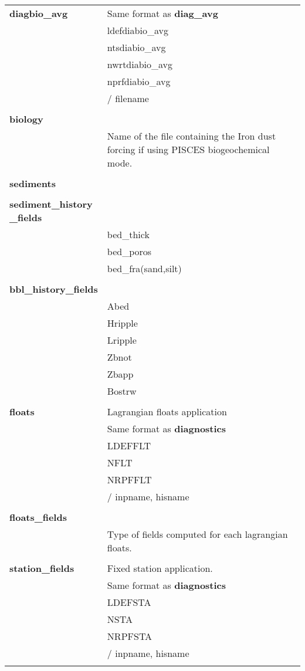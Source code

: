 \begin{longtable}{|p{0.25\linewidth}|p{0.75\linewidth}|}
\large{\textbf{diagbio\_avg}} & Same format as \large{\textbf{diag\_avg}}  \\
&ldefdiabio\_avg  \\
&ntsdiabio\_avg   \\
&nwrtdiabio\_avg  \\
&nprfdiabio\_avg  \\
&/ filename \\
&  \\ 

\large{\textbf{biology}} &     \\
& Name of the file containing the Iron dust forcing if using PISCES biogeochemical
mode. \\
&  \\ 

\large{\textbf{sediments}} &     \\
&  \\ 

\large{\textbf{sediment\_history \_fields}} &     \\
& bed\_thick  \\
& bed\_poros \\ 
& bed\_fra(sand,silt) \\
&  \\ 

\large{\textbf{bbl\_history\_fields}} &     \\
& Abed  \\
& Hripple  \\
& Lripple  \\
& Zbnot  \\
& Zbapp  \\
& Bostrw \\
&  \\ 

\large{\textbf{floats}} & Lagrangian floats application \\
& Same format as \large{\textbf{diagnostics}}  \\
& LDEFFLT \\
& NFLT \\
& NRPFFLT  \\
& / inpname, hisname \\
&  \\ 

\large{\textbf{floats\_fields}} &     \\
& Type of fields computed for each lagrangian floats. \\
&  \\ 

\large{\textbf{station\_fields}} &  Fixed station application.   \\
& Same format as \large{\textbf{diagnostics}}  \\
& LDEFSTA \\
& NSTA    \\
& NRPFSTA \\
&/ inpname, hisname \\
&    \\


\end{longtable}
